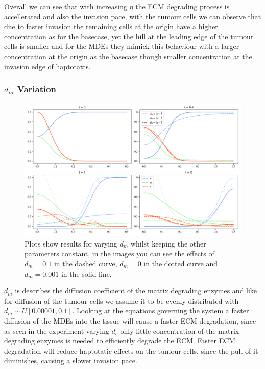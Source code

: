 Overall we can see that with increasing $\eta$ the ECM degrading process is accellerated and also the invasion pace, with the tumour cells we can observe that due to faster invasion the remaining cells at the origin have a higher concentration as for the basecase, yet the hill at the leading edge of the tumour cells is smaller and for the MDEs they mimick this behaviour with a larger concentration at the origin as the basecase though smaller concentration at the invasion edge of haptotaxis.

\subsubsection*{$d_m$ Variation}
\begin{figure}[h]
    \centering
    \includegraphics[width=\textwidth]{resources/images/dm_variation.png}
    \caption{Plots show results for varying $d_m$ whilst keeping the other parameters constant, in the images you can see the effects of $d_m=0.1$ in the dashed curve, $d_m=0$ in the dotted curve and $d_m=0.001$ in the solid line.}
    \label{fig:dm_variation}
\end{figure}
$d_m$ is describes the diffusion coefficient of the matrix degrading enzymes and like for diffusion of the tumour cells we assume it to be evenly distributed with $d_m \sim U[0.00001,0.1]$. Looking at the equations governing the system a faster diffusion of the MDEs into the tissue will cause a faster ECM degradation, since as seen in the experiment varying $d_c$ only little concentration of the matrix degrading enzymes is needed to efficiently degrade the ECM. Faster ECM degradation will reduce haptotatic effects on the tumour cells, since the pull of it diminishes, causing a slower invasion pace. \newline 
